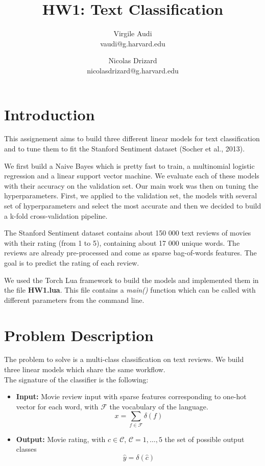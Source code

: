 \documentclass[11pt]{article}
\title{HW1: Text Classification}
\author{Virgile Audi \\ vaudi@g.harvard.edu \and Nicolas Drizard \\ nicolasdrizard@g.harvard.edu }
\begin{document}
\maketitle{}
\section{Introduction}

This assignement aims to build three different linear models for text classification and to tune them to fit the Stanford Sentiment dataset (Socher et al., 2013).

We first build a Naive Bayes which is pretty fast to train, a multinomial logistic regression and a linear support vector machine. We evaluate each of these models with their accuracy on the validation set. Our main work was then on tuning the hyperparameters. First, we applied to the validation set, the models with several set of hyperparameters and select the most accurate and then we decided to build a k-fold cross-validation pipeline.

The Stanford Sentiment dataset contains about 150 000 text reviews of movies with their rating (from 1 to 5), containing about 17 000 unique words. The reviews are already pre-processed and come as sparse bag-of-words features. The goal is to predict the rating of each review.

We used the Torch Lua framework to build the models and implemented them in the file \textbf{HW1.lua}. This file contains a \textit{main()} function which can be called with different parameters from the command line.


\section{Problem Description}

The problem to solve is a multi-class classification on text reviews. We build three linear models which share the same workflow.\\

\noindent The signature of the classifier is the following:

\begin{itemize}
	\item \textbf{Input:} Movie review input with sparse features corresponding to one-hot vector for each word, with $\mathcal{F}$ the vocabulary of the language.
	\[ x = \sum_{f \in \mathcal{F}} \delta(f) \]
	\item \textbf{Output:} Movie rating, with $c \in \mathcal{C}$, $\mathcal{C} = {1, \hdots, 5}$ the set of possible output classes
	\[ \hat{y} = \delta(\hat{c})\]
\end{itemize}
\end{document}
